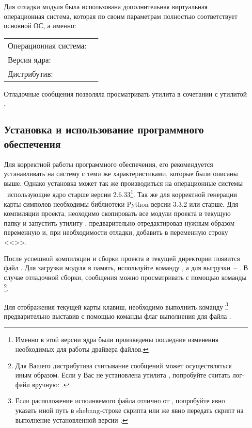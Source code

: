 Для отладки модуля была использована дополнительная виртуальная операционная система,
которая по своим параметрам полностью соответствует основной ОС, а именно:
\begin{flushleft}
	\begin{tabular}{ll}
		Операционная система:&\gnulinux\\
		Версия ядра:&\linuxv\\
		Дистрибутив:&\archlinux
	\end{tabular}
\end{flushleft}

\newpar
Отладочные сообщения позволяла просматривать утилита  в сочетании с 
утилитой .

\subsection{Установка и использование программного обеспечения}
Для корректной работы программного обеспечения, его рекомендуется устанавливать
на систему с теми же характеристиками, которые были описаны выше. Однако установка
может так же производиться на операционные системы \gnulinux\ использующие ядро старше версии 
2.6.33\footnote{Именно в этой версии ядра были произведены последние изменения необходимых
для работы драйвера файлов.}. 
Так же для корректной генерации карты симполов необходимы библиотеки Python версии 3.3.2 или старше.
\newpar
Для компиляции проекта, неоходимо скопировать все модули проекта в текущую папку и запустить
утилиту , предварительно отредактировав нужным образом переменную  и,
при необходимости отладки, добавить в переменную  строку <<>>.
\newpar

После успешной компиляции и сборки проекта в текущей директории появится файл .
Для загрузки модуля в память, используйте команду , а для выгрузки~--
. В случае отладочной сборки, сообщения можно просматривать с помощью команды 
\footnote{Для Вашего дистрибутива считывание сообщений может осуществляться иным образом.
	Если у Вас не установлена утилита , попробуйте считать лог-файл вручную: 
	.}.
\newpar

Для отображения текущей карты клавиш, необходимо выполнить команду
\footnote{Если расположение исполняемого файла  отлично от 
, попробуйте явно указать иной путь в shebang-строке скрипта или же явно передать скрипт на
выполнение установленной версии .} предварительно выставив с помощью 
команды  флаг выполнения для
файла .
\newpar

